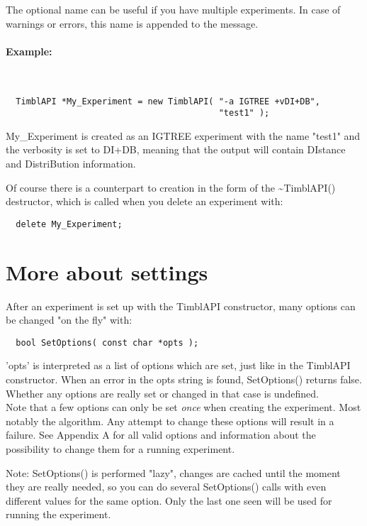 \documentclass{article}
\begin{document}
The optional name can be useful if you have multiple experiments.
In case of warnings or errors, this name is appended to the message.\\

\paragraph{Example:}\ \\
\begin{verbatim}
  TimblAPI *My_Experiment = new TimblAPI( "-a IGTREE +vDI+DB", 
                                          "test1" );
\end{verbatim}

My\_Experiment is created as an IGTREE experiment with the name "test1"
and the verbosity is set to DI+DB, meaning that the output will
contain DIstance and DistriBution information.

Of course there is a counterpart to creation in the form of the 
\~{ }TimblAPI() destructor, which is called when you delete an
experiment with:

\begin{verbatim}
  delete My_Experiment;
\end{verbatim}

\section{More about settings}

After an experiment is set up with the TimblAPI constructor, many
options can be changed "on the fly" with:

\begin{verbatim}
  bool SetOptions( const char *opts );
\end{verbatim}

'opts' is interpreted as a list of options which are set, just like in
the TimblAPI constructor. When an error in the opts string is found,
SetOptions() returns false. Whether any options are really set or
changed in that case is undefined. \\
Note that a few options can only be set {\em once} when creating the
experiment. Most notably the algorithm. Any attempt to change these
options will result in a failure.
See Appendix A for all valid options and information about the
possibility to change them for a running experiment.

Note: SetOptions() is performed "lazy", changes are cached until the
moment they are really needed, so you can do several SetOptions()
calls with even different values for the same option. Only the last
one seen will be used for running the experiment.
\end{document}
